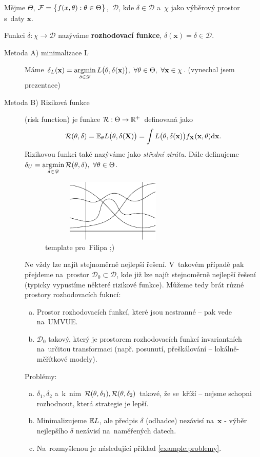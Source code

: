 \begin{define}
	Mějme $\Theta$, $\mathcal{F}=\big\{ f(x,\theta):\theta\in\Theta \big\}$,~$\mathscr{D}$, kde $\delta\in\mathscr{D}$ a~$\chi$ jako výběrový prostor s~daty $\textbf{x}$.
	
	Funkci $\delta:\chi\to\mathscr{D}$ nazýváme \textbf{rozhodovací funkce}, $\delta(\textbf{x})=\delta\in\mathscr{D}$. 
\end{define}
\begin{description}
	\item[Metoda A) minimalizace L] Máme $\delta_L(\textbf{x})=\mathop{\mathrm{argmin}}\limits_{\delta\in\mathscr{D}} L\big(\theta,\delta(\textbf{x})\big),~\forall \theta\in\Theta,~\forall\textbf{x}\in\chi$. (vynechal jsem prezentace)
	\item[Metoda B) Riziková funkce] (risk function) je funkce $\mathcal{R}:\Theta\to\mathbb{R}^+$ definovaná jako $$\mathcal{R}(\theta,\delta)=\mathbb{E}_\theta L\big(\theta,\delta(\textbf{X})\big)=\int L\big(\theta,\delta(\textbf{x})\big)f_\textbf{X}(\textbf{x},\theta)\mathrm{d}\textbf{x}.$$
	Rizikovou funkci také nazýváme jako \textit{střední ztrátu}. Dále definujeme $\delta_U=\mathop{\mathrm{argmin}}\limits_{\delta\in\mathscr{D}} \mathcal{R}(\theta,\delta),~\forall\theta\in\Theta$.


\begin{figure}[h]
\centering
\includegraphics[width=7cm,height=3cm]{pictures/P4_1v2}
\caption{template pro~Filipa ;)}
\label{fig:p41v2}
\end{figure}
Ne vždy lze najít stejnoměrně nejlepší řešení. V~takovém případě pak přejdeme na~prostor $\mathscr{D}_0\subset\mathscr{D}$, kde již lze najít stejnoměrně nejlepší řešení (typicky vypustíme některé rizikové funkce). Můžeme tedy brát různé prostory rozhodovacích fukncí:
\begin{enumerate}[a)]
	\item  Prostor rozhodovacích funkcí, které jsou nestranné -- pak vede na~UMVUE.
	\item $\mathscr{D}_0$ takový, který je prostorem rozhodovacích funkcí invariantních na~určitou transformaci (např. posunutí, přeškálování -- lokálně-měřítkové modely).
\end{enumerate}

Problémy: \begin{enumerate}[a)]
	\item $\delta_1,\delta_2$ a~k~nim $\mathcal{R}(\theta,\delta_1),\mathcal{R}(\theta,\delta_2)$ takové, že se~kříží -- nejsme schopni rozhodnout, která strategie je lepší.
	\item Minimalizujeme $\mathbb{E} L$, ale předpis $\delta$ (odhadce) nezávisí na~$\textbf{x}$ - výběr nejlepšího $\delta$ nezávisí na~naměřených datech.
	\item Na~rozmyšlenou je následující příklad \ref{example:problemy}.
\end{enumerate}
\end{description}

